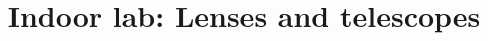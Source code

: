 \documentclass[11pt, preprint]{aastex}
\begin{document}
\title{\bf Indoor lab: Lenses and telescopes}

~
\vspace{-30pt}


\end{document}
